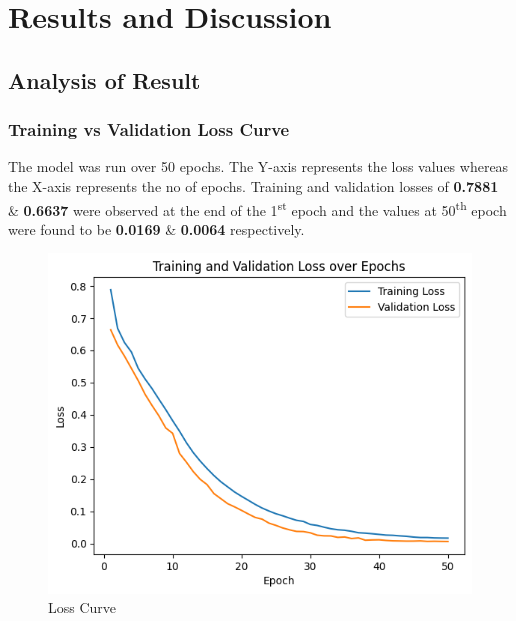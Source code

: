     \chapter{Results and Discussion}
       \section{Analysis of Result}
       \subsection{Training vs Validation Loss Curve}
       The model was run over 50 epochs. The Y-axis represents the loss values whereas the X-axis represents the no of epochs. Training and validation losses of \textbf{0.7881} \& \textbf{0.6637} were observed at the end of the 1\textsuperscript{st} epoch and the values at 50\textsuperscript{th} epoch were found to be \textbf{0.0169} \& \textbf{0.0064} respectively.
       \begin{figure}[h]
           \centering
           \includegraphics[width=0.8\linewidth]{img/lossgraph.png}
           \caption{Loss Curve}
           \label{fig:Loss curve over 50 epochs}
       \end{figure}
       \pagebreak
